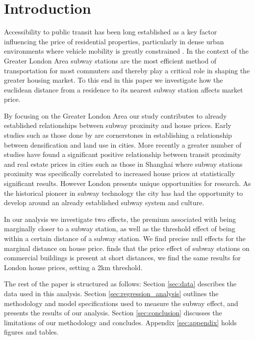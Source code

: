 \section{Introduction}
Accessibility to public transit has been long established as a key factor influencing the price of residential properties, particularly in dense urban environments where vehicle mobility is greatly constrained \citep{rietveld_2007}.
 In the context of the Greater London Area subway stations are the most efficient method of transportation for most commuters and thereby play a critical role in shaping the greater housing market.
  To this end in this paper we investigate how the euclidean distance from a residence to its nearest subway station affects market price.

By focusing on the Greater London Area our study contributes to already established relationships between subway proximity and house prices. 
Early studies such as those done by \citet{muth_1969} are cornerstones in establishing a relationship between densification and land use in cities. 
More recently a greater number of studies have found a significant positive relationship between transit proximity and real estate prices 
in cities such as those in Shanghai \citep{zhou_2019} where subway stations proximity was specifically correlated to 
increased house prices at statistically significant results. 
However London presents unique opportunities for research. 
As the historical pioneer in subway technology the city has had 
the opportunity to develop around an already established subway system and culture.

In our analysis we investigate two effects, the premium associated with being marginally closer to a subway station,
as well as the threshold effect of being within a certain distance of a subway station. We find precise null effects for the marginal
distance on house price. \citet{rietveld_2007} finds that 
the price effect of subway stations on commercial buildings is present at short distances, we find the same results for London house prices, setting a 2km threshold.


The rest of the paper is structured as follows: Section \ref{sec:data} describes the data used in this analysis.
Section \ref{sec:regression_analysis} outlines the methodology and model specifications used to measure the subway effect,
 and presents the results of our analysis. Section \ref{sec:conclusion} discusses the limitations of our methodology and concludes.
  Appendix \ref{sec:appendix} holds figures and tables.
